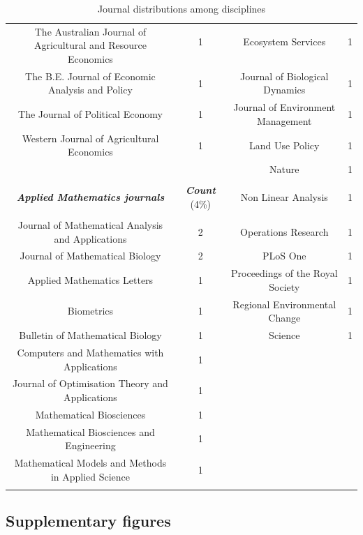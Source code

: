 \begin{table}[H]
{\begin{tabular}{@{\extracolsep{1pt}} cccc}
\multirow{2}{20em}{The Australian Journal of Agricultural and Resource Economics} & 1 & Ecosystem Services & 1 \\ 
\\
The B.E. Journal of Economic Analysis and Policy & 1 & Journal of Biological Dynamics & 1 \\ 
The Journal of Political Economy & 1 & Journal of Environment Management & 1 \\ 
Western Journal of Agricultural Economics & 1 & Land Use Policy & 1 \\ 
 &  & Nature & 1 \\ 
 \cline{1-2} \noalign{\vskip\doublerulesep
         \vskip-\arrayrulewidth} \cline{1-2}\\[-1.8ex] 
\textbf{\textit{Applied Mathematics journals}} & \textbf{\textit{Count}} (4\%) & Non Linear Analysis & 1 \\[+1.2ex] 
\cline{1-2} \noalign{\vskip\doublerulesep
         \vskip-\arrayrulewidth} \cline{1-2}\\ 
Journal of Mathematical Analysis and Applications & 2 & Operations Research & 1 \\ 
Journal of Mathematical Biology & 2  & PLoS One & 1 \\ 
Applied Mathematics Letters & 1& Proceedings of the Royal Society & 1 \\ 
Biometrics & 1 & Regional Environmental Change & 1 \\ 
Bulletin of Mathematical Biology & 1 & Science & 1 \\ 
Computers and Mathematics with Applications & 1 &  &  \\ 
Journal of Optimisation Theory and Applications & 1 &  &  \\ 
Mathematical Biosciences & 1 &  &  \\ 
Mathematical Biosciences and Engineering & 1 &  &  \\ 
Mathematical Models and Methods in Applied Science & 1 &  &  \\ 
\hline \hline\\[-1.8ex] 
\end{tabular} 
}
\label{tab:journal_disci} 
\caption{Journal distributions among disciplines}
\end{table}


\subsection{Supplementary figures}

